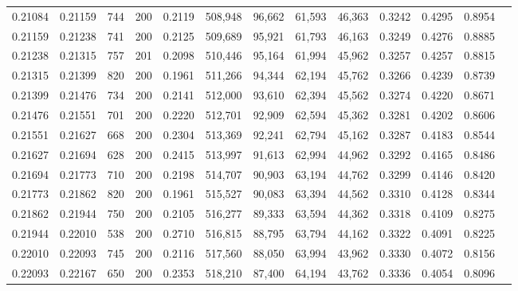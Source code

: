 \begin{tabular}{rrrrrrrrrrrrr}
0.21084 & 0.21159 &   744 & 200 &                                     0.2119 & 508,948 &  96,662 &  61,593 &  46,363 & 0.3242 & 0.4295 & 0.8954 \\
0.21159 & 0.21238 &   741 & 200 &                                     0.2125 & 509,689 &  95,921 &  61,793 &  46,163 & 0.3249 & 0.4276 & 0.8885 \\
0.21238 & 0.21315 &   757 & 201 &                                     0.2098 & 510,446 &  95,164 &  61,994 &  45,962 & 0.3257 & 0.4257 & 0.8815 \\
0.21315 & 0.21399 &   820 & 200 &                                     0.1961 & 511,266 &  94,344 &  62,194 &  45,762 & 0.3266 & 0.4239 & 0.8739 \\
0.21399 & 0.21476 &   734 & 200 &                                     0.2141 & 512,000 &  93,610 &  62,394 &  45,562 & 0.3274 & 0.4220 & 0.8671 \\
0.21476 & 0.21551 &   701 & 200 &                                     0.2220 & 512,701 &  92,909 &  62,594 &  45,362 & 0.3281 & 0.4202 & 0.8606 \\
0.21551 & 0.21627 &   668 & 200 &                                     0.2304 & 513,369 &  92,241 &  62,794 &  45,162 & 0.3287 & 0.4183 & 0.8544 \\
0.21627 & 0.21694 &   628 & 200 &                                     0.2415 & 513,997 &  91,613 &  62,994 &  44,962 & 0.3292 & 0.4165 & 0.8486 \\
0.21694 & 0.21773 &   710 & 200 &                                     0.2198 & 514,707 &  90,903 &  63,194 &  44,762 & 0.3299 & 0.4146 & 0.8420 \\
0.21773 & 0.21862 &   820 & 200 &                                     0.1961 & 515,527 &  90,083 &  63,394 &  44,562 & 0.3310 & 0.4128 & 0.8344 \\
0.21862 & 0.21944 &   750 & 200 &                                     0.2105 & 516,277 &  89,333 &  63,594 &  44,362 & 0.3318 & 0.4109 & 0.8275 \\
0.21944 & 0.22010 &   538 & 200 &                                     0.2710 & 516,815 &  88,795 &  63,794 &  44,162 & 0.3322 & 0.4091 & 0.8225 \\
0.22010 & 0.22093 &   745 & 200 &                                     0.2116 & 517,560 &  88,050 &  63,994 &  43,962 & 0.3330 & 0.4072 & 0.8156 \\
0.22093 & 0.22167 &   650 & 200 &                                     0.2353 & 518,210 &  87,400 &  64,194 &  43,762 & 0.3336 & 0.4054 & 0.8096 \\

\end{tabular}
